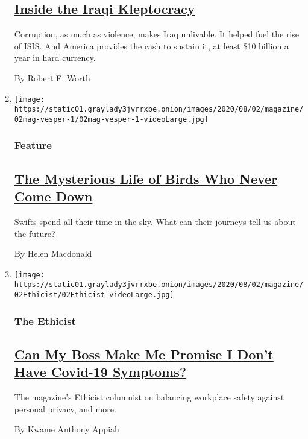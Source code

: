 \begin{enumerate}
  \hypertarget{inside-the-iraqi-kleptocracy}{%
  \subsection{\texorpdfstring{\href{/2020/07/29/magazine/iraq-corruption.html}{Inside
  the Iraqi
  Kleptocracy}}{Inside the Iraqi Kleptocracy}}\label{inside-the-iraqi-kleptocracy}}

  Corruption, as much as violence, makes Iraq unlivable. It helped fuel
  the rise of ISIS. And America provides the cash to sustain it, at
  least \$10 billion a year in hard currency.

  By Robert F. Worth
\item
  \texttt{[image: https://static01.graylady3jvrrxbe.onion/images/2020/08/02/magazine/02mag-vesper-1/02mag-vesper-1-videoLarge.jpg]}

  \hypertarget{feature-2}{%
  \subsubsection{Feature}\label{feature-2}}

  \hypertarget{the-mysterious-life-of-birds-who-never-come-down}{%
  \subsection{\texorpdfstring{\href{/2020/07/29/magazine/vesper-flights.html}{The
  Mysterious Life of Birds Who Never Come
  Down}}{The Mysterious Life of Birds Who Never Come Down}}\label{the-mysterious-life-of-birds-who-never-come-down}}

  Swifts spend all their time in the sky. What can their journeys tell
  us about the future?

  By Helen Macdonald
\item
  \texttt{[image: https://static01.graylady3jvrrxbe.onion/images/2020/08/02/magazine/02Ethicist/02Ethicist-videoLarge.jpg]}

  \hypertarget{the-ethicist}{%
  \subsubsection{The Ethicist}\label{the-ethicist}}

  \hypertarget{can-my-boss-make-me-promise-i-dont-have-covid-19-symptoms}{%
  \subsection{\texorpdfstring{\href{/2020/07/28/magazine/can-my-boss-make-me-promise-i-dont-have-covid-19-symptoms.html}{Can
  My Boss Make Me Promise I Don't Have Covid-19
  Symptoms?}}{Can My Boss Make Me Promise I Don't Have Covid-19 Symptoms?}}\label{can-my-boss-make-me-promise-i-dont-have-covid-19-symptoms}}

  The magazine's Ethicist columnist on balancing workplace safety
  against personal privacy, and more.

  By Kwame Anthony Appiah
\end{enumerate}

